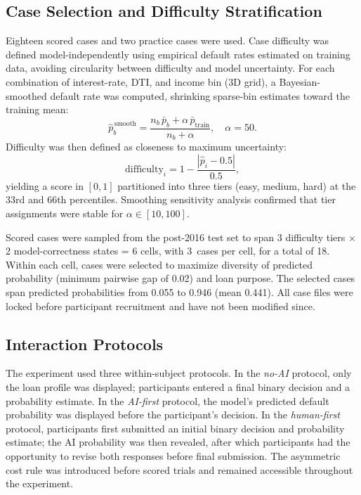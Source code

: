 \documentclass[conference]{IEEEtran}
\begin{document}
\subsection{Case Selection and Difficulty Stratification}

Eighteen scored cases and two practice cases were used. Case difficulty
was defined model-independently using empirical default rates estimated
on training data, avoiding circularity between difficulty and model
uncertainty. For each combination of interest-rate, DTI, and income bin
(3D grid), a Bayesian-smoothed default rate was computed, shrinking
sparse-bin estimates toward the training mean:
\begin{equation}
  \hat{p}^{\,\text{smooth}}_b =
    \frac{n_b \,\bar{p}_b + \alpha\,\bar{p}_{\text{train}}}
         {n_b + \alpha},\quad \alpha = 50.
  \label{eq:smooth}
\end{equation}
Difficulty was then defined as closeness to maximum uncertainty:
\begin{equation}
  \text{difficulty}_i = 1 - \frac{|\hat{p}_i - 0.5|}{0.5},
  \label{eq:difficulty}
\end{equation}
yielding a score in $[0,1]$ partitioned into three tiers (easy, medium,
hard) at the 33rd and 66th percentiles. Smoothing sensitivity analysis
confirmed that tier assignments were stable for $\alpha \in [10, 100]$.

Scored cases were sampled from the post-2016 test set to span 3
difficulty tiers $\times$ 2 model-correctness states = 6 cells, with
3~cases per cell, for a total of 18. Within each cell, cases were
selected to maximize diversity of predicted probability (minimum pairwise
gap of 0.02) and loan purpose. The selected cases span predicted
probabilities from 0.055 to 0.946 (mean 0.441). All case files were
locked before participant recruitment and have not been modified since.

\subsection{Interaction Protocols}
\label{sec:protocols}

The experiment used three within-subject protocols. In the \emph{no-AI}
protocol, only the loan profile was displayed; participants entered a
final binary decision and a probability estimate. In the
\emph{AI-first} protocol, the model's predicted default probability was
displayed before the participant's decision. In the \emph{human-first}
protocol, participants first submitted an initial binary decision and
probability estimate; the AI probability was then revealed, after which
participants had the opportunity to revise both responses before final
submission. The asymmetric cost rule was introduced before scored trials
and remained accessible throughout the experiment.
\end{document}
